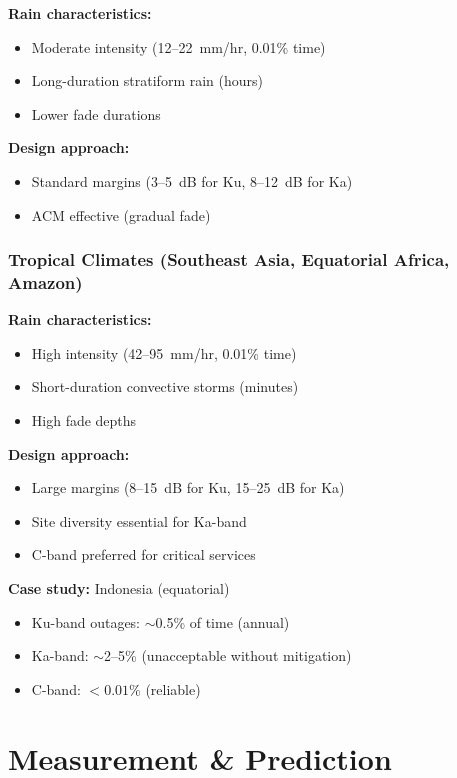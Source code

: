 \textbf{Rain characteristics:}
\begin{itemize}
\item Moderate intensity (12--22~mm/hr, 0.01\% time)
\item Long-duration stratiform rain (hours)
\item Lower fade durations
\end{itemize}

\textbf{Design approach:}
\begin{itemize}
\item Standard margins (3--5~dB for Ku, 8--12~dB for Ka)
\item ACM effective (gradual fade)
\end{itemize}

\subsubsection{Tropical Climates (Southeast Asia, Equatorial Africa, Amazon)}

\textbf{Rain characteristics:}
\begin{itemize}
\item High intensity (42--95~mm/hr, 0.01\% time)
\item Short-duration convective storms (minutes)
\item High fade depths
\end{itemize}

\textbf{Design approach:}
\begin{itemize}
\item Large margins (8--15~dB for Ku, 15--25~dB for Ka)
\item Site diversity essential for Ka-band
\item C-band preferred for critical services
\end{itemize}

\textbf{Case study:} Indonesia (equatorial)
\begin{itemize}
\item Ku-band outages: $\sim$0.5\% of time (annual)
\item Ka-band: $\sim$2--5\% (unacceptable without mitigation)
\item C-band: $< 0.01\%$ (reliable)
\end{itemize}

\section{Measurement \& Prediction}

